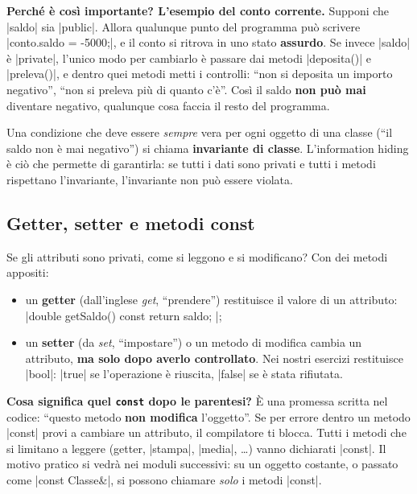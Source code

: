 \textbf{Perché è così importante? L'esempio del conto corrente.}
Supponi che \cc|saldo| sia \cc|public|. Allora qualunque punto del programma
può scrivere \cc|conto.saldo = -5000;|, e il conto si ritrova in uno stato
\textbf{assurdo}. Se invece \cc|saldo| è \cc|private|, l'unico modo per
cambiarlo è passare dai metodi \cc|deposita()| e \cc|preleva()|, e dentro quei
metodi metti i controlli: ``non si deposita un importo negativo'', ``non si
preleva più di quanto c'è''. Così il saldo \textbf{non può mai} diventare
negativo, qualunque cosa faccia il resto del programma.

Una condizione che deve essere \emph{sempre} vera per ogni oggetto di una
classe (``il saldo non è mai negativo'') si chiama \textbf{invariante di classe}.
L'information hiding è ciò che permette di garantirla: se tutti i dati sono
privati e tutti i metodi rispettano l'invariante, l'invariante non può essere
violata.

\subsection*{Getter, setter e metodi const}

Se gli attributi sono privati, come si leggono e si modificano? Con dei metodi
appositi:
\begin{itemize}
  \item un \textbf{getter} (dall'inglese \emph{get}, ``prendere'') restituisce
        il valore di un attributo: \cc|double getSaldo() const { return saldo; }|;
  \item un \textbf{setter} (da \emph{set}, ``impostare'') o un metodo di
        modifica cambia un attributo, \textbf{ma solo dopo averlo controllato}.
        Nei nostri esercizi restituisce \cc|bool|: \cc|true| se l'operazione è
        riuscita, \cc|false| se è stata rifiutata.
\end{itemize}

\textbf{Cosa significa quel \texttt{const} dopo le parentesi?} È una promessa
scritta nel codice: ``questo metodo \textbf{non modifica} l'oggetto''. Se per
errore dentro un metodo \cc|const| provi a cambiare un attributo, il
compilatore ti blocca. Tutti i metodi che si limitano a leggere (getter,
\cc|stampa|, \cc|media|, \ldots) vanno dichiarati \cc|const|. Il motivo pratico
si vedrà nei moduli successivi: su un oggetto costante, o passato come
\cc|const Classe&|, si possono chiamare \emph{solo} i metodi \cc|const|.

